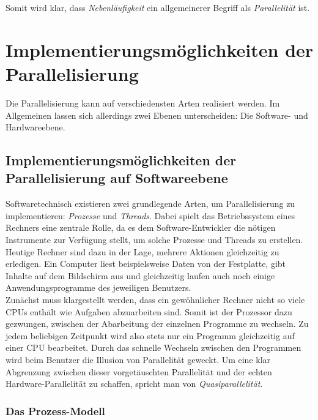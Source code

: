 			Somit wird klar, dass \textit{Nebenläufigkeit} ein allgemeinerer Begriff als \textit{Parallelität} ist. \cite{NebenlaeufigeProg}

	\section{Implementierungsmöglichkeiten der Parallelisierung}
	
		Die Parallelisierung kann auf verschiedensten Arten realisiert werden. Im Allgemeinen lassen sich allerdings zwei Ebenen unterscheiden: Die Software- und Hardwareebene.
				
		\subsection{Implementierungsmöglichkeiten der Parallelisierung auf Softwareebene}

			Softwaretechnisch existieren zwei grundlegende Arten, um Parallelisierung zu implementieren: \textit{Prozesse} und \textit{Threads}.
			Dabei spielt das Betriebssystem eines Rechners eine zentrale Rolle, da es dem Software-Entwickler die nötigen Instrumente zur Verfügung stellt, um solche Prozesse und Threads zu erstellen.\\
			Heutige Rechner sind dazu in der Lage, mehrere Aktionen gleichzeitig zu erledigen. Ein Computer liest beispielsweise Daten von der Festplatte, gibt Inhalte auf dem Bildschirm aus und gleichzeitig laufen auch noch einige Anwendungsprogramme des jeweiligen Benutzers.\\
			Zunächst muss klargestellt werden, dass ein gewöhnlicher Rechner nicht so viele CPUs enthält wie Aufgaben abzuarbeiten sind. Somit ist der Prozessor dazu gezwungen, zwischen der Abarbeitung der einzelnen Programme zu wechseln. Zu jedem beliebigen Zeitpunkt wird also stets nur ein Programm gleichzeitig auf einer CPU bearbeitet. Durch das schnelle Wechseln zwischen den Programmen wird beim Benutzer die Illusion von Parallelität geweckt. Um eine klar Abgrenzung zwischen dieser vorgetäuschten Parallelität und der echten Hardware-Parallelität zu schaffen, spricht man von \textit{Quasiparallelität}. \cite{ModerneBetriebssysteme}
			
			\subsubsection{Das Prozess-Modell}
				\label{ProzessModell}
			
